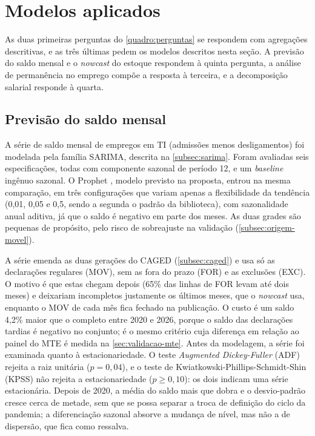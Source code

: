 \section{Modelos aplicados}

As duas primeiras perguntas do \autoref{quadro:perguntas} se respondem com agregações descritivas, e as três últimas pedem os modelos descritos nesta seção. A previsão do saldo mensal e o \textit{nowcast} do estoque respondem à quinta pergunta, a análise de permanência no emprego compõe a resposta à terceira, e a decomposição salarial responde à quarta.

\subsection{Previsão do saldo mensal}
\label{subsec:metodo-sarima}

A série de saldo mensal de empregos em TI (admissões menos desligamentos) foi modelada pela família SARIMA, descrita na \autoref{subsec:sarima}. Foram avaliadas seis especificações, todas com componente sazonal de período 12, e um \textit{baseline} ingênuo sazonal. O Prophet \cite{Taylor2018}, modelo previsto na proposta, entrou na mesma comparação, em três configurações que variam apenas a flexibilidade da tendência (0,01, 0,05 e 0,5, sendo a segunda o padrão da biblioteca), com sazonalidade anual aditiva, já que o saldo é negativo em parte dos meses. As duas grades são pequenas de propósito, pelo risco de sobreajuste na validação (\autoref{subsec:origem-movel}).

A série emenda as duas gerações do CAGED (\autoref{subsec:caged}) e usa só as declarações regulares (MOV), sem as fora do prazo (FOR) e as exclusões (EXC). O motivo é que estas chegam depois (65\% das linhas de FOR levam até dois meses) e deixariam incompletos justamente os últimos meses, que o \textit{nowcast} usa, enquanto o MOV de cada mês fica fechado na publicação. O custo é um saldo 4,2\% maior que o completo entre 2020 e 2026, porque o saldo das declarações tardias é negativo no conjunto; é o mesmo critério cuja diferença em relação ao painel do MTE é medida na \autoref{sec:validacao-mte}. Antes da modelagem, a série foi examinada quanto à estacionariedade. O teste \textit{Augmented Dickey-Fuller} (ADF) rejeita a raiz unitária ($p = 0{,}04$), e o teste de Kwiatkowski-Phillips-Schmidt-Shin (KPSS) não rejeita a estacionariedade ($p \geq 0{,}10$): os dois indicam uma série estacionária. Depois de 2020, a média do saldo mais que dobra e o desvio-padrão cresce cerca de metade, sem que se possa separar a troca de definição do ciclo da pandemia; a diferenciação sazonal absorve a mudança de nível, mas não a de dispersão, que fica como ressalva.

